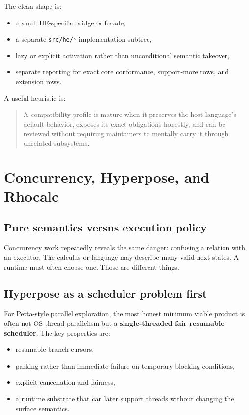 \documentclass[11pt]{article}
\newcommand{\code}[1]{\texttt{#1}}
\newcommand{\strong}[1]{\textbf{#1}}
\begin{document}
The clean shape is:

\begin{itemize}
  \item a small HE-specific bridge or facade,
  \item a separate \code{src/he/*} implementation subtree,
  \item lazy or explicit activation rather than unconditional semantic takeover,
  \item separate reporting for exact core conformance, support-more rows, and extension rows.
\end{itemize}

A useful heuristic is:

\begin{quote}
A compatibility profile is mature when it preserves the host language's default behavior, exposes its exact obligations honestly, and can be reviewed without requiring maintainers to mentally carry it through unrelated subsystems.
\end{quote}

\section{Concurrency, Hyperpose, and Rhocalc}

\subsection{Pure semantics versus execution policy}

Concurrency work repeatedly reveals the same danger: confusing a relation with an executor. The calculus or language may describe many valid next states. A runtime must often choose one. Those are different things.

\subsection{Hyperpose as a scheduler problem first}

For Petta-style parallel exploration, the most honest minimum viable product is often not OS-thread parallelism but a \strong{single-threaded fair resumable scheduler}. The key properties are:

\begin{itemize}
  \item resumable branch cursors,
  \item parking rather than immediate failure on temporary blocking conditions,
  \item explicit cancellation and fairness,
  \item a runtime substrate that can later support threads without changing the surface semantics.
\end{itemize}
\end{document}
